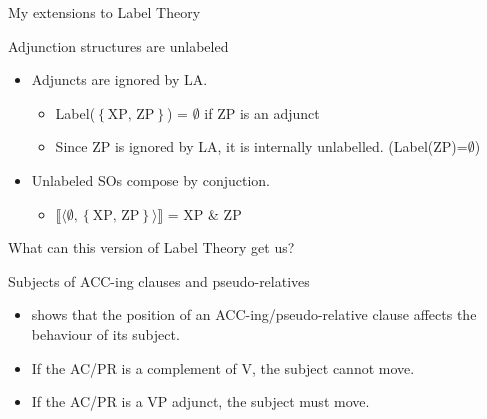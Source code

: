 \documentclass[Proposal]{subfiles}
\begin{document}
\begin{frame}
  {My extensions to Label Theory}
  \begin{block}
    {Adjunction structures are unlabeled}
    \begin{itemize}
      \item Adjuncts are ignored by LA.
	\begin{itemize}
	  \item Label($\left\{ \text{XP, ZP} \right\}$) = $\emptyset$ if ZP is an adjunct
	  \item Since ZP is ignored by LA, it is internally unlabelled. (Label(ZP)=$\emptyset$)
	\end{itemize}
	\pause
      \item Unlabeled SOs compose by conjuction.
	\begin{itemize}
	  \item $\llbracket\langle \emptyset, \left\{ \text{XP, ZP} \right\}\rangle\rrbracket$ = XP \& ZP 
	\end{itemize}
    \end{itemize}
  \end{block}
\end{frame}
\begin{frame}
  {What can this version of Label Theory get us?}
  \begin{block}
    {Subjects of ACC-ing clauses and pseudo-relatives}
    \begin{itemize}
      \item<2-> \textcite{cinque1996pseudo} shows that the position of an ACC-ing/pseudo-relative clause affects the behaviour of its subject.
    \end{itemize}
    \begin{itemize}
      \item<3-> If the AC/PR is a complement of V, the subject cannot move.
      \item<3-> If the AC/PR is a VP adjunct, the subject must move.
    \end{itemize}
  \end{block}
\end{frame}
\end{document}
